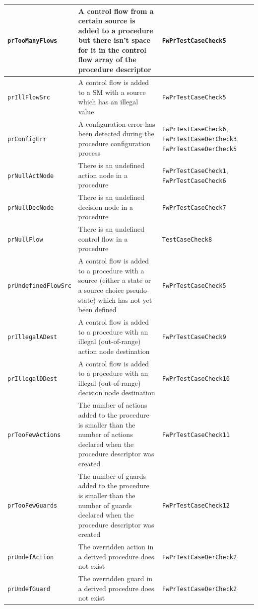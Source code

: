 \documentclass[requirements]{../fwprofile}
\begin{document}
\begin{longtable}{|p{3cm}|p{3.7cm}|p{4.5cm}|}
\hline
\texttt{prTooManyFlows} & A control flow from a certain source is added to a procedure but there isn't space for it in the control flow array of the
procedure descriptor & \texttt{FwPrTestCaseCheck5} \\
\hline
\texttt{prIllFlowSrc} & A control flow is added to a SM with a source which has an illegal value & \texttt{FwPrTestCaseCheck5} \\
\hline
\texttt{prConfigErr} & A configuration error has been detected during the procedure configuration process & \texttt{FwPrTestCaseCheck6}, \texttt{FwPrTestCaseDerCheck3}, \texttt{FwPrTestCaseDerCheck5} \\
\hline
\texttt{prNullActNode} & There is an undefined action node in a procedure & \texttt{FwPrTestCaseCheck1}, \texttt{FwPrTestCaseCheck6} \\
\hline
\texttt{prNullDecNode} & There is an undefined decision node in a procedure & \texttt{FwPrTestCaseCheck7} \\
\hline
\texttt{prNullFlow} & There is an undefined control flow in a procedure & \texttt{TestCaseCheck8} \\
\hline
\texttt{prUndefinedFlowSrc} & A control flow is added to a procedure with a source (either a state or a source choice pseudo-state) which has not yet been defined & \texttt{FwPrTestCaseCheck5} \\
\hline
\texttt{prIllegalADest} & A control flow is added to a procedure with an illegal (out-of-range) action node destination & \texttt{FwPrTestCaseCheck9} \\
\hline
\texttt{prIllegalDDest} & A control flow is added to a procedure with an illegal (out-of-range) decision node destination 
& \texttt{FwPrTestCaseCheck10} \\
\hline
\texttt{prTooFewActions} & The number of actions added to the procedure is smaller than the number of actions declared when the procedure descriptor was created 
& \texttt{FwPrTestCaseCheck11} \\
\hline
\texttt{prTooFewGuards} & The number of guards added to the procedure is smaller than the number of guards declared when the procedure descriptor was created 
& \texttt{FwPrTestCaseCheck12} \\
\hline
\texttt{prUndefAction} & The overridden action in a derived procedure does not exist 
& \texttt{FwPrTestCaseDerCheck2} \\
\hline
\texttt{prUndefGuard} & The overridden guard in a derived procedure does not exist
& \texttt{FwPrTestCaseDerCheck2} \\

\end{longtable}
\end{document}
